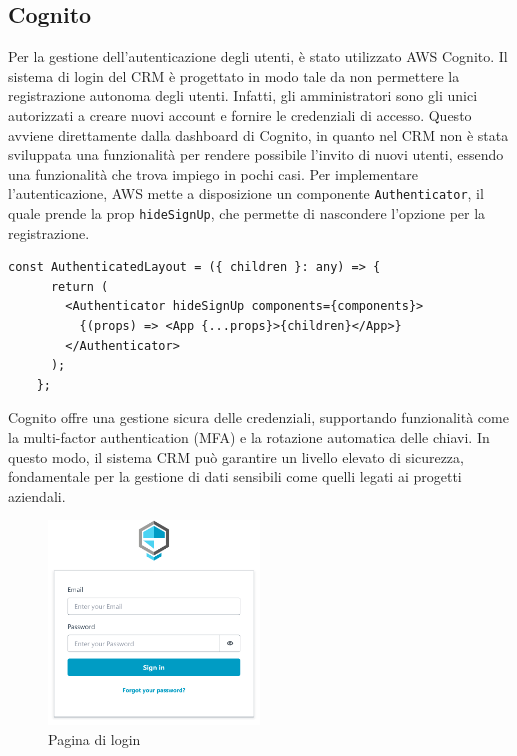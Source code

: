 \documentclass[target=bach,aauheader=,style=]{thud}
\begin{document}
\subsection{Cognito}
Per la gestione dell'autenticazione degli utenti, è stato utilizzato AWS Cognito. Il sistema di login del CRM è progettato in modo tale da non permettere la registrazione autonoma degli utenti. Infatti, gli amministratori sono gli unici autorizzati a creare nuovi account e fornire le credenziali di accesso. Questo avviene direttamente dalla dashboard di Cognito, in quanto nel CRM non è stata sviluppata una funzionalità per rendere possibile l'invito di nuovi utenti, essendo una funzionalità che trova impiego in pochi casi. Per implementare l'autenticazione, AWS mette a disposizione un componente \texttt{Authenticator}, il quale prende la prop \texttt{hideSignUp}, che permette di nascondere l'opzione per la registrazione.


\begin{lstlisting}[caption=Parte del file \texttt{AuthenticatedLayout.tsx} del CRM]
    const AuthenticatedLayout = ({ children }: any) => {
      return (
        <Authenticator hideSignUp components={components}>
          {(props) => <App {...props}>{children}</App>}
        </Authenticator>
      );
    };
\end{lstlisting}

\noindent Cognito offre una gestione sicura delle credenziali, supportando funzionalità come la multi-factor authentication (MFA) e la rotazione automatica delle chiavi. In questo modo, il sistema CRM può garantire un livello elevato di sicurezza, fondamentale per la gestione di dati sensibili come quelli legati ai progetti aziendali.

\begin{figure}[htbp]
    \centering
    \includegraphics[width=0.5\textwidth]{img/login.pdf} 
    \caption{Pagina di login}
\end{figure}
\end{document}
